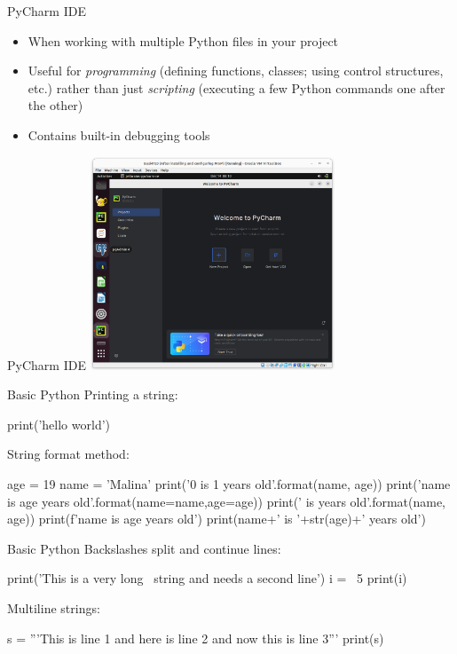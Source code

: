 \documentclass[ignorenonframetext,xcolor=x11names]{beamer}
\begin{document}
\begin{frame}{PyCharm IDE}
\begin{itemize}
   \item When working with multiple Python files in your project
   \item Useful for \emph{programming} (defining functions, classes; using control structures, etc.) rather than just \emph{scripting} (executing a few Python commands one after the other)
   \item Contains built-in debugging tools
\end{itemize}
\end{frame}

\begin{frame}{PyCharm IDE}
\centering
\includegraphics[height=2.5in]{screen4.png}
\end{frame}


\begin{frame}[fragile]{Basic Python}
Printing a string:
\footnotesize
\begin{pythoncode}
print('hello world')
\end{pythoncode}
\normalsize
String format method:
\footnotesize
\begin{pythoncode}
age = 19
name = 'Malina'
print('{0} is {1} years old'.format(name, age))
print('{name} is {age} years old'.format(name=name,age=age))
print('{} is {} years old'.format(name, age))
print(f'{name} is {age} years old')
print(name+' is '+str(age)+' years old')
\end{pythoncode}
\end{frame}

\begin{frame}[fragile]{Basic Python}
Backslashes split and continue lines:
\footnotesize
\begin{pythoncode}
print('This is a very long \
string and needs a second line')
i = \
5
print(i)
\end{pythoncode}
\normalsize
Multiline strings:
\footnotesize
\begin{pythoncode}
s = '''This is line 1
and here is line 2
and now this is line 3'''
print(s)
\end{pythoncode}
\normalsize
\end{frame}
\end{document}
